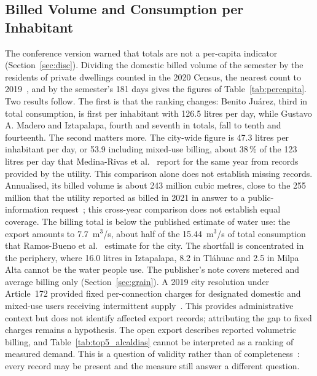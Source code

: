 \documentclass[runningheads]{llncs}
\newenvironment{nuevobloque}{}{}
\renewcommand{\_}{\origunderscore\allowbreak}
\begin{document}
\begin{nuevobloque}
\subsection{Billed Volume and Consumption per Inhabitant}
\label{sec:percapita}

The conference version warned that totals are not a per-capita indicator
(Section~\ref{sec:disc}). Dividing the domestic billed volume of the semester by the
residents of private dwellings counted in the 2020 Census, the nearest count to
2019~\cite{inegi2021}, and by the semester's 181 days gives the figures of
Table~\ref{tab:percapita}. Two results follow. The first is that the ranking changes:
Benito Ju\'arez, third in total consumption, is first per inhabitant with 126.5
litres per day, while Gustavo A. Madero and Iztapalapa, fourth and seventh in
totals, fall to tenth and fourteenth. The second matters more. The city-wide
figure is 47.3 litres per inhabitant per day, or 53.9 including mixed-use billing,
about 38\,\% of the 123 litres per day that Medina-Rivas et al.~\cite{medina2022}
report for the same year from records provided by the utility. This comparison alone does not establish missing records. Annualised, its billed volume is about 243
million cubic metres, close to the 255 million that the utility reported as
billed in 2021 in answer to a public-information request~\cite{infocdmx2022};
this cross-year comparison does not establish equal coverage. The billing total
is below the published estimate of water use: the export amounts to
7.7~m$^3$/s, about half of the 15.44~m$^3$/s of total consumption that Ramos-Bueno
et al.~\cite{ramosbueno2024} estimate for the city. The shortfall is concentrated
in the periphery, where 16.0 litres in Iztapalapa, 8.2 in Tl\'ahuac and 2.5 in
Milpa Alta cannot be the water people use. The publisher's note covers metered and
average billing only (Section~\ref{sec:grain}). A 2019 city resolution under Article~172 provided fixed
per-connection charges for designated domestic and mixed-use users receiving intermittent
supply~\cite{gcdmx2019}. This provides administrative context but does not identify affected
export records; attributing the gap to fixed charges remains a hypothesis. The open
export describes reported volumetric billing, and Table~\ref{tab:top5_alcaldias}
cannot be interpreted as a ranking of measured demand. This is
a question of validity rather than of completeness~\cite{vetro2016}: every record
may be present and the measure still answer a different question.


\end{nuevobloque}
\end{document}
